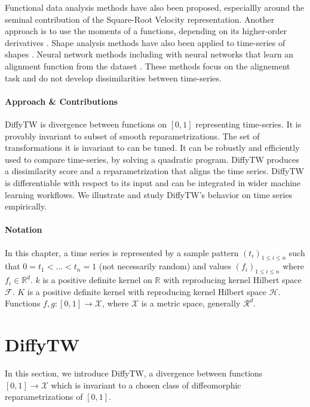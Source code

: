 Functional data analysis methods have also been proposed, especiallly around the seminal contribution of the Square-Root Velocity representation\citep{srvf}. Another approach is to use the moments of a functions, depending on its higher-order derivatives \citep{curve-moments}. Shape analysis methods have also been applied to time-series of shapes \citep{2108.05634,Durrleman2013}. Neural network methods including with neural networks that learn an alignment function from the dataset \citep{2106.11911,dtan,martinez22a}. These methods focus on the alignement task and do not develop dissimilarities between time-series.

\paragraph{Approach \& Contributions}
DiffyTW is divergence between functions on $[0,1]$ representing time-series. It is provably invariant to subset of smooth reparametrizations. The set of transformations it is invariant to can be tuned. It can be robustly and efficiently used to compare time-series, by solving a quadratic program. DiffyTW produces a dissimilarity score and a reparametrization that aligns the time series. DiffyTW is differentiable with respect to its input and can be integrated in wider machine learning workflows. We illustrate and study DiffyTW's behavior on time series empirically.

\paragraph{Notation} In this chapter, a time series is represented by a sample pattern $(t_i)_{1 \leq i \leq n}$ such that $0 = t_1 < \ldots < t_n = 1$ (not necessarily random) and values $(f_i)_{1\leq i\leq n}$ where $f_i \in\mathbb R^d$. $k$ is a positive definite kernel on $\mathbb R$ with reproducing kernel Hilbert space $\mathcal F$. $K$ is a positive definite kernel with reproducing kernel Hilbert space $\mathcal H$. Functions $f,g:[0,1] \to \mathcal X$, where $\mathcal X$ is a metric space, generally $\mathcal R^d$.

\section{DiffyTW}
In this section, we introduce DiffyTW, a divergence between functions $[0,1] \to \mathcal X$ which is invariant to a chosen class of diffeomorphic reparametrizations of $[0,1]$.

